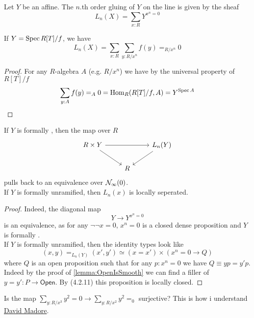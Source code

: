 \documentclass{article}
\begin{document}
\begin{definition}
	Let $Y$ be an affine. The $n$.th order gluing of $Y$ on the line is given by the sheaf\[
	L_n(X) = \sum_{x : R} Y^{x^n = 0}
	\]
\end{definition}
\begin{lemma}
	If $Y = \operatorname{Spec} R[T]/f$, we have
	\[
	L_n(X) = \sum_{x : R} \sum_{y : R / x^n} f(y) =_{R/x^n} 0
	\]
	
\end{lemma}
\begin{proof}
	For any $R$-algebra $A$ (e.g. $R / x^n$) we have by the universal property of $R[T] / f$
	\[
	\sum_{y : A} f(y) =_A 0 = \Hom_R(R[T] / f , A) = Y^{\Spec A} %
	\]
\end{proof}
\begin{lemma}
	If $Y$ is formally \etale, then the map over $R$
	\[\begin{tikzcd}
		{R \times Y} && {L_n(Y)} \\
		& R
		\arrow[from=1-1, to=1-3]
		\arrow[from=1-1, to=2-2]
		\arrow[from=1-3, to=2-2]
	\end{tikzcd}\]
	pulls back to an equivalence over $\mathcal{N}_\infty(0)$. \\
	If $Y$ is formally unramified, then $L_n(x)$ is locally seperated.
\end{lemma}
\begin{proof}
	Indeed, the diagonal map 
	\[
	Y \to Y^{x^n = 0}
	\]
	is an equivalence, as for any $\lnot \lnot x = 0$, $x^n = 0$ is a closed dense proposition and $Y$ is formally \etale. \\
	If $Y$ is formally unramified, then the identity types look like
	\[
	(x,y) =_{L_n(Y)} (x',y') \simeq (x = x') \times (x^n = 0 \to Q)
	\]
	where $Q$ is an open proposition such that for any $p : x^n = 0$ we have $Q \equiv  y p = y' p$. Indeed by the proof of \ref{lemma:OpenIsSmooth} we can find a filler of $y = y' : P \to \mathsf{Open}$. By \cite{cherubini2023foundationsyntheticalgebraicgeometry}(4.2.11) this proposition is locally closed.	
\end{proof}
\begin{question}
	Is the map $\sum_{y : R / x^3} y^2 = 0 \to \sum_{y : R / x^2} y^2 =_0$ surjective? This is how i understand \href{http://www.madore.org/~david/weblog/d.2013-09-21.2160.definition-schema.html#d.2013-09-21.2160.droite-origine-doublee}{David Madore}.
\end{question}
\end{document}
